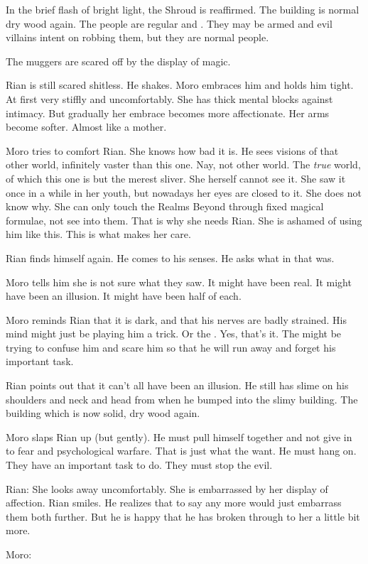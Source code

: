 In the brief flash of bright light, the Shroud is reaffirmed. 
The building is normal dry wood again. 
The people are regular \humans and \scathae.
They may be armed and evil villains intent on robbing them, but they are normal people. 

The muggers are scared off by the display of magic.

\begin{comment}
  \section{Moro comforts Rian}
\end{comment}
Rian is still scared shitless. 
He shakes.
Moro embraces him and holds him tight. 
At first very stiffly and uncomfortably.
She has thick mental blocks against intimacy.
But gradually her embrace becomes more affectionate. 
Her arms become softer.
Almost like a mother. 

Moro tries to comfort Rian. 
She knows how bad it is.
He sees visions of that other world, infinitely vaster than this one. 
Nay, not other world. 
The \emph{true} world, of which this one is but the merest sliver.
She herself cannot see it.
She saw it once in a while in her youth, but nowadays her eyes are closed to it.
She does not know why.
She can only touch the Realms Beyond through fixed magical formulae, not see into them. 
That is why she needs Rian.
She is ashamed of using him like this.
This is what makes her care. 

Rian finds himself again. 
He comes to his senses. 
He asks what in \itzach that was. 

Moro tells him she is not sure what they saw.
It might have been real.
It might have been an illusion.
It might have been half of each. 

Moro reminds Rian that it is dark, and that his nerves are badly strained. 
His mind might just be playing him a trick. 
Or the \qliphoth.
Yes, that's it.
The \qliphoth might be trying to confuse him and scare him so that he will run away and forget his important task.

Rian points out that it can't all have been an illusion.
He still has slime on his shoulders and neck and head from when he bumped into the slimy building.
The building which is now solid, dry wood again. 

Moro slaps Rian up (but gently).
He must pull himself together and not give in to fear and psychological warfare.
That is just what the \qliphoth want. 
He must hang on.
They have an important task to do.
They must stop the evil. 

Rian:
She looks away uncomfortably.
She is embarrassed by her display of affection. 
Rian smiles. 
He realizes that to say any more would just embarrass them both further. 
But he is happy that he has broken through to her a little bit more. 

Moro:





